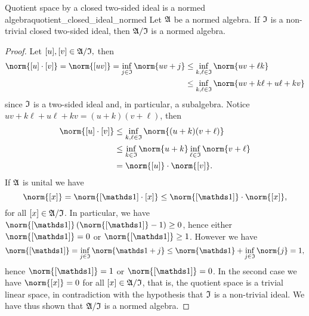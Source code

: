 \begin{lemma}{Quotient space by a closed two-sided ideal is a normed algebra}{quotient_closed_ideal_normed}
    Let \(\mathfrak{A}\) be a normed algebra. If \(\mathfrak{I}\) is a non-trivial closed two-sided ideal, then \(\mathfrak{A}/\mathfrak{I}\) is a normed algebra.
\end{lemma}
\begin{proof}
    Let \([u],[v] \in \mathfrak{A}/\mathfrak{I},\) then
    \begin{align*}
        \norm{[u]\cdot[v]} = \norm{[uv]} = \inf_{j\in \algebra{I}}{\norm{uv + j}}
        &\leq \inf_{k,\ell \in \algebra{I}}{\norm{uv + \ell k}}\\
        &\leq \inf_{k,\ell \in \algebra{I}}{\norm{uv + k\ell + u \ell + kv}}
    \end{align*}
    since \(\mathfrak{I}\) is a two-sided ideal and, in particular, a subalgebra. Notice \(uv + k\ell + u \ell + kv = (u + k)(v + \ell)\), then
    \begin{align*}
        \norm{[u]\cdot[v]} &\leq \inf_{k,\ell \in \algebra{I}}{\norm{(u+k)(v + \ell)}}\\
                           &\leq \inf_{k\in\algebra{I}}{\norm{u+k}}\inf_{\ell \in \algebra{I}}{\norm{v+\ell}}\\
                           &= \norm{[u]}\cdot\norm{[v]}.
    \end{align*}
    If \(\mathfrak{A}\) is unital we have
    \begin{equation*}
        \norm{[x]} = \norm{[\unity]\cdot[x]} \leq \norm{[\unity]}\cdot\norm{[x]},
    \end{equation*}
    for all \([x] \in \mathfrak{A}/\mathfrak{I}\). In particular, we have \(\norm{[\unity]}\left(\norm{[\unity]} - 1\right) \geq 0\), hence either \(\norm{[\unity]} = 0\) or \(\norm{[\unity]}\geq 1\). However we have
    \begin{equation*}
        \norm{[\unity]} = \inf_{j\in \algebra{I}}{\norm{\unity + j}} \leq \norm{\unity}+\inf_{j\in\algebra{I}}{\norm{j}} = 1,
    \end{equation*}
    hence \(\norm{[\unity]} = 1\) or \(\norm{[\unity]} = 0\). In the second case we have \(\norm{[x]} = 0\) for all \([x] \in \mathfrak{A}/\mathfrak{I}\), that is, the quotient space is a trivial linear space, in contradiction with the hypothesis that \(\mathfrak{I}\) is a non-trivial ideal. We have thus shown that \(\mathfrak{A}/\mathfrak{I}\) is a normed algebra.
\end{proof}

